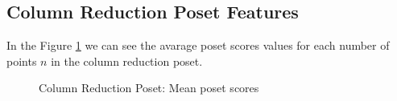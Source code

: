 \documentclass{article}
\begin{document}
\subsection{Column Reduction Poset Features}
\par In the Figure \ref{fig:scores_poset_mean_crp} we can see the avarage poset scores values for each number of points $n$ in the column reduction poset.
\begin{figure}[ht]
  \vspace{-96pt}
  \centering
  \hspace*{-0.18999999999999995\textwidth}
  \caption{Column Reduction Poset: Mean poset scores}
  \label{fig:scores_poset_mean_crp}
\end{figure}
\end{document}
